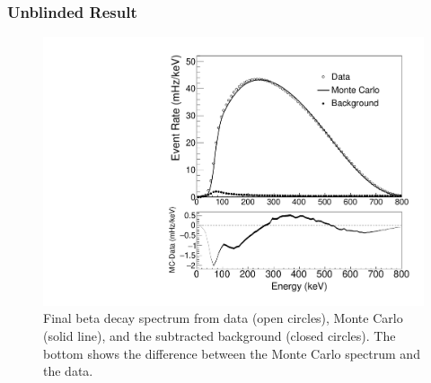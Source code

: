 \subsubsection{Unblinded Result}

\begin{figure}[h]
  \centering
  \includegraphics[scale=0.4]{5-UCNAResults/SuperSumTotal.pdf} 
  \caption{Final beta decay spectrum from data (open circles), Monte Carlo (solid line),
    and the subtracted background (closed circles). The bottom shows the difference between the
    Monte Carlo spectrum and the data.}
  \label{fig:FinalSpectrum}
\end{figure}

